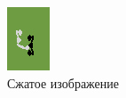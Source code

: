 \documentclass{letask}
\begin{document}
\begin{figure}[H]
\begin{center}
\begin{minipage}[h]{0.4\linewidth}
\includegraphics[width=1\linewidth]{observation_downscaled.png}
\caption{Сжатое изображение} 
\label{observation_downscaled}
\end{minipage}
\hfill
\begin{minipage}[h]{0.4\linewidth}

\end{minipage}
\end{center}
\end{figure}
\end{document}
